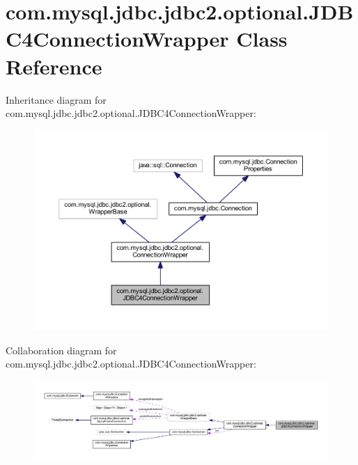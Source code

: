 \hypertarget{classcom_1_1mysql_1_1jdbc_1_1jdbc2_1_1optional_1_1_j_d_b_c4_connection_wrapper}{}\section{com.\+mysql.\+jdbc.\+jdbc2.\+optional.\+J\+D\+B\+C4\+Connection\+Wrapper Class Reference}
\label{classcom_1_1mysql_1_1jdbc_1_1jdbc2_1_1optional_1_1_j_d_b_c4_connection_wrapper}


Inheritance diagram for com.\+mysql.\+jdbc.\+jdbc2.\+optional.\+J\+D\+B\+C4\+Connection\+Wrapper\+:
\nopagebreak
\begin{figure}[H]
\begin{center}
\leavevmode
\includegraphics[width=350pt]{classcom_1_1mysql_1_1jdbc_1_1jdbc2_1_1optional_1_1_j_d_b_c4_connection_wrapper__inherit__graph}
\end{center}
\end{figure}


Collaboration diagram for com.\+mysql.\+jdbc.\+jdbc2.\+optional.\+J\+D\+B\+C4\+Connection\+Wrapper\+:
\nopagebreak
\begin{figure}[H]
\begin{center}
\leavevmode
\includegraphics[width=350pt]{classcom_1_1mysql_1_1jdbc_1_1jdbc2_1_1optional_1_1_j_d_b_c4_connection_wrapper__coll__graph}
\end{center}
\end{figure}
